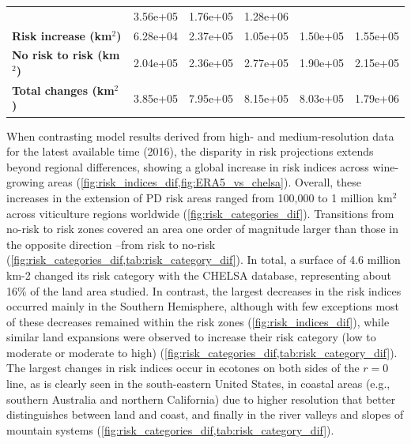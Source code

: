 \begin{table}[H]
{\begin{tabular}{lccccc}
                                                 & 3.56e+05
                                                 & 1.76e+05
                                                 & 1.28e+06
            \\
            \textbf{Risk increase (km$^2$)}      & 6.28e+04
                                                 & 2.37e+05
                                                 & 1.05e+05
                                                 & 1.50e+05
                                                 & 1.55e+05
            \\
            \textbf{No risk to risk (km$^2$)}    & 2.04e+05
                                                 & 2.36e+05
                                                 & 2.77e+05
                                                 & 1.90e+05
                                                 & 2.15e+05
            \\
            \textbf{Total changes (km$^2$)}      & 3.85e+05
                                                 & 7.95e+05
                                                 & 8.15e+05
                                                 & 8.03e+05
                                                 & 1.79e+06
            \\ \hline
        \end{tabular}
    }
\end{table}

When contrasting model results derived from high- and medium-resolution
data for the latest available time (2016), the disparity in risk projections
extends beyond regional differences, showing a global increase in risk indices
across wine-growing areas (\cref{fig:risk_indices_dif,fig:ERA5_vs_chelsa}).
Overall, these increases in the extension of PD risk areas ranged from
100,000 to 1 million km$^2$ across viticulture regions worldwide
(\cref{fig:risk_categories_dif}). Transitions
from no-risk to risk zones covered an area one order of magnitude larger than
those in the opposite direction --from risk to no-risk
(\cref{fig:risk_categories_dif,tab:risk_category_dif}). In total, a surface of
4.6 million km-2 changed its risk category with the CHELSA database,
representing about 16\% of the land area studied. In contrast, the largest
decreases in the risk indices occurred mainly in the Southern Hemisphere,
although with few exceptions most of these decreases remained within the risk
zones (\cref{fig:risk_indices_dif}), while similar land expansions were
observed to  increase their risk category (low to moderate or moderate to high)
(\cref{fig:risk_categories_dif,tab:risk_category_dif}). The largest changes in
risk indices occur in ecotones on both sides of the $r=0$ line, as is clearly
seen in the south-eastern United States, in coastal areas (e.g., southern
Australia and northern California) due to higher resolution that better
distinguishes between land and coast, and finally in the river valleys and
slopes of mountain systems
(\cref{fig:risk_categories_dif,tab:risk_category_dif}).

